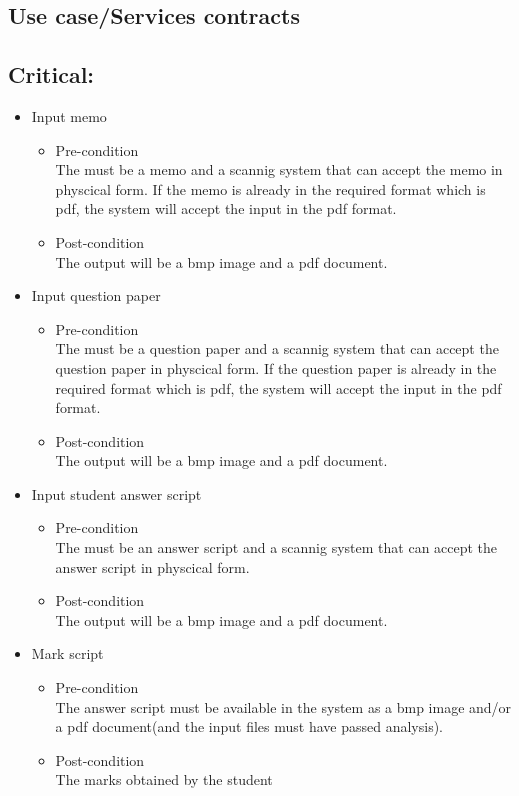 \documentclass{article}
\begin{document}
	\subsection{Use case/Services contracts}
\subsection{Critical:}

\begin{itemize}
	
		\item Input memo
			\begin{itemize}
				\item Pre-condition \\
					 The must be a memo and a scannig system that can accept the memo in physcical form. If the memo is already in the required format which is pdf, the system will accept the input in the pdf format.
				\item Post-condition \\
					 The output will be a bmp image and a pdf document.
			\end{itemize}
		\item Input  question paper
			\begin{itemize}
				\item Pre-condition \\
					 The must be a question paper and a scannig system that can accept the question paper in physcical form. If the question paper is already in the required format which is pdf, the system will accept the input in the pdf format.
				\item Post-condition \\
					 The output will be a bmp image and a pdf document.
			\end{itemize}
		\item Input  student answer script
			\begin{itemize}
				\item Pre-condition \\
					 The must be an answer script and a scannig system that can accept the answer script in physcical form. 
				\item Post-condition \\
					 The output will be a bmp image and a pdf document.
			\end{itemize}


		\item Mark script
			\begin{itemize}
				\item Pre-condition \\
					 The answer script must be available in the system as a bmp image and/or a pdf document(and the input files must have passed analysis).
				\item Post-condition \\
					 The marks obtained by the student
			\end{itemize}
			

\end{itemize}
\end{document}
